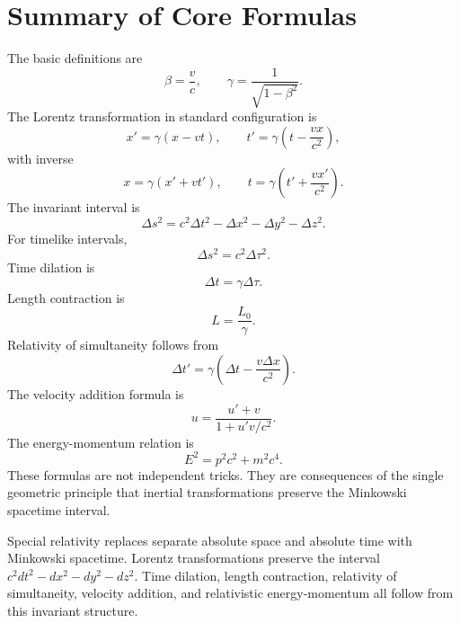 \clearpage

\section{Summary of Core Formulas}

The basic definitions are
\[
\beta=\frac{v}{c},
\qquad
\gamma=\frac{1}{\sqrt{1-\beta^2}}.
\]
The Lorentz transformation in standard configuration is
\[
x'=\gamma(x-vt),
\qquad
 t'=\gamma\left(t-\frac{vx}{c^2}\right),
\]
with inverse
\[
x=\gamma(x'+vt'),
\qquad
 t=\gamma\left(t'+\frac{vx'}{c^2}\right).
\]
The invariant interval is
\[
\Delta s^2=c^2\Delta t^2-\Delta x^2-\Delta y^2-\Delta z^2.
\]
For timelike intervals,
\[
\Delta s^2=c^2\Delta\tau^2.
\]
Time dilation is
\[
\Delta t=\gamma\Delta\tau.
\]
Length contraction is
\[
L=\frac{L_0}{\gamma}.
\]
Relativity of simultaneity follows from
\[
\Delta t'=\gamma\left(\Delta t-\frac{v\Delta x}{c^2}\right).
\]
The velocity addition formula is
\[
u=\frac{u'+v}{1+u'v/c^2}.
\]
The energy-momentum relation is
\[
E^2=p^2c^2+m^2c^4.
\]
These formulas are not independent tricks. They are consequences of the single
geometric principle that inertial transformations preserve the Minkowski
spacetime interval.

\begin{summarybox}
Special relativity replaces separate absolute space and absolute time with
Minkowski spacetime. Lorentz transformations preserve the interval
\(c^2dt^2-dx^2-dy^2-dz^2\). Time dilation, length contraction, relativity of
simultaneity, velocity addition, and relativistic energy-momentum all follow
from this invariant structure.
\end{summarybox}
